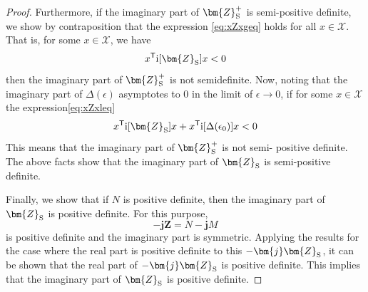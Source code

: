 \documentclass[graybox, envcountchap]{svmult}
\begin{document}
\begin{proof}
Furthermore, if the imaginary part of $ \bm{Z}_{\rm S}^{+} $ is semi-positive definite, we show by contraposition that the expression \ref{eq:xZxgeq} holds for all $x \in \mathcal{X}$.
That is, for some $x \in \mathcal{X}$, we have
\begin{equation}\label{eq:xZxleq}
x^{\sf T} \imag[\bm{Z}_{\rm S}] x < 0
\end{equation}
then the imaginary part of $ \bm{Z}_{\rm S}^{+} $ is not semidefinite.
Now, noting that the imaginary part of $\Delta(\epsilon)$ asymptotes to 0 in the limit of $\epsilon \rightarrow 0$, if for some $x \in \mathcal{X}$ the expression\ref{eq:xZxleq}
\begin{equation*}
x^{\sf T} \imag[ \bm{Z}_{\rm S}] x 
+
x^{\sf T} \imag[\Delta(\epsilon_0)]x < 0
\end{equation*}
This means that the imaginary part of $\bm{Z}_{\rm S}^{+} $ is not semi- positive definite.
The above facts show that the imaginary part of $\bm{Z}_{\rm S}$ is semi-positive definite.

Finally, we show that if $N$ is positive definite, then the imaginary part of $\bm{Z}_{\rm S}$ is positive definite.
For this purpose, 
\begin{equation*}
-\bm{j} \bm{Z} = N - \bm{j} M
\end{equation*}
is positive definite and the imaginary part is symmetric.
Applying the results for the case where the real part is positive definite to this $-\bm{j} \bm{Z}_{\rm S}$, it can be shown that the real part of $-\bm{j} \bm{Z}_{\rm S}$ is positive definite.
This implies that the imaginary part of $\bm{Z}_{\rm S}$ is positive definite.
\end{proof}


\end{document}
